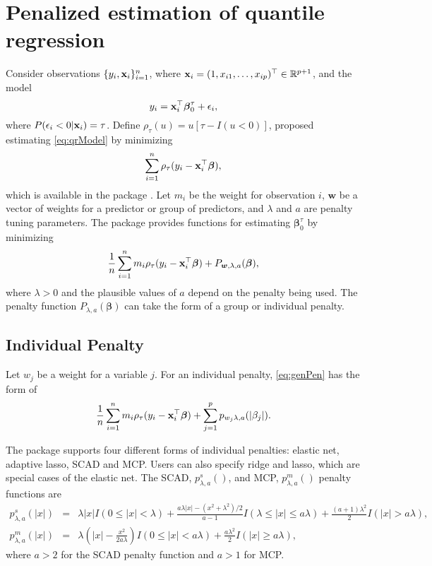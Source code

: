 \section{Penalized estimation of quantile regression}\label{penalized-estimation-of-quantile-regression}

Consider observations \(\{y_i,{\bf x}_i\}_{i=1}^n\), where \({\bf x}_i = (1,x_{i1},\ldots,x_{ip})^\top \in \mathbb{R}^{p+1}\), and the model
\begin{equation}
y_i = {\bf x}_i^\top {\boldsymbol\beta}^{\tau}_0 + \epsilon_i,
\label{eq:qrModel}
\end{equation}
where \(P(\epsilon_i < 0 | {\bf x}_i)=\tau\). Define \(\rho_\tau(u) = u[\tau-I(u<0)]\), \citet{origQR} proposed estimating \eqref{eq:qrModel} by minimizing
\begin{equation}
\sum_{i=1}^n \rho_\tau(y_i-{\bf x}_i^\top\boldsymbol \beta),
\label{eq:qr}
\end{equation}
which is available in the package . Let \(m_i\) be the weight for observation \(i\), \(\boldsymbol w\) be a vector of weights for a predictor or group of predictors, and \(\lambda\) and \(a\) are penalty tuning parameters. The package  provides functions for estimating \(\boldsymbol \beta^\tau_0\) by minimizing
\begin{equation}
\frac{1}{n} \sum_{i=1}^n m_i \rho_\tau(y_i - {\bf x}_i^\top\boldsymbol \beta) + P_{\boldsymbol w,\lambda,a}(\boldsymbol \beta),
\label{eq:genPen}
\end{equation}
where \(\lambda>0\) and the plausible values of \(a\) depend on the penalty being used. The penalty function \(P_{\lambda,a}(\boldsymbol \beta)\) can take the form of a group or individual penalty.

\subsection{Individual Penalty}

Let \(w_j\) be a weight for a variable \(j\). For an individual penalty, \eqref{eq:genPen} has the form of
\begin{equation}
\frac{1}{n} \sum_{i=1}^n m_i \rho_\tau(y_i - {\bf x}_i^\top\boldsymbol \beta) + \sum_{j=1}^p p_{w_j\lambda,a}(|\beta_j|).
\label{eq:indPen}
\end{equation}

The package  supports four different forms of individual penalties: elastic net, adaptive lasso, SCAD and MCP. Users can also specify ridge and lasso, which are special cases of the elastic net. The SCAD, \(p^s_{\lambda,a}()\), and MCP, \(p^m_{\lambda,a}()\) penalty functions are
\begin{eqnarray*}
p^s_{\lambda,a}(|x|) &=& \lambda|x|I(0 \leq |x| < \lambda) + \frac{a\lambda|x|-(x^2+\lambda^2)/2}{a-1}I(\lambda \leq |x| \leq a\lambda) + \frac{(a+1)\lambda^2}{2}I(|x|>a\lambda),  \\
p^m_{\lambda,a}(|x|) &=& \lambda\left(|x|-\frac{x^2}{2a\lambda}\right)I(0 \leq |x| < a\lambda) + \frac{a\lambda^2}{2}I(|x|\geq a\lambda),
\end{eqnarray*}
where \(a>2\) for the SCAD penalty function and \(a>1\) for MCP.

